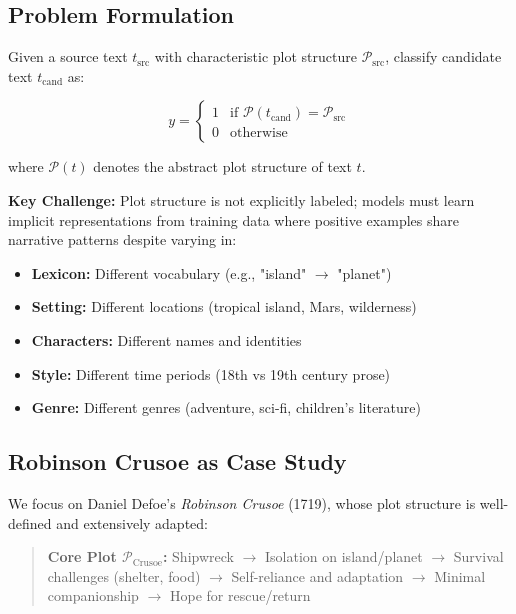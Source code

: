 \documentclass[11pt,a4paper]{article}
\begin{document}
\subsection{Problem Formulation}

Given a source text $t_{\text{src}}$ with characteristic plot structure $\mathcal{P}_{\text{src}}$, classify candidate text $t_{\text{cand}}$ as:

\begin{equation}
y = \begin{cases}
1 & \text{if } \mathcal{P}(t_{\text{cand}}) = \mathcal{P}_{\text{src}} \\
0 & \text{otherwise}
\end{cases}
\end{equation}

where $\mathcal{P}(t)$ denotes the abstract plot structure of text $t$.

\textbf{Key Challenge:} Plot structure is not explicitly labeled; models must learn implicit representations from training data where positive examples share narrative patterns despite varying in:

\begin{itemize}
    \item \textbf{Lexicon:} Different vocabulary (e.g., "island" $\rightarrow$ "planet")
    \item \textbf{Setting:} Different locations (tropical island, Mars, wilderness)
    \item \textbf{Characters:} Different names and identities
    \item \textbf{Style:} Different time periods (18th vs 19th century prose)
    \item \textbf{Genre:} Different genres (adventure, sci-fi, children's literature)
\end{itemize}

\subsection{Robinson Crusoe as Case Study}

We focus on Daniel Defoe's \textit{Robinson Crusoe} (1719), whose plot structure is well-defined and extensively adapted:

\begin{quote}
\small
\textbf{Core Plot $\mathcal{P}_{\text{Crusoe}}$:} Shipwreck $\rightarrow$ Isolation on island/planet $\rightarrow$ Survival challenges (shelter, food) $\rightarrow$ Self-reliance and adaptation $\rightarrow$ Minimal companionship $\rightarrow$ Hope for rescue/return
\end{quote}
\end{document}
